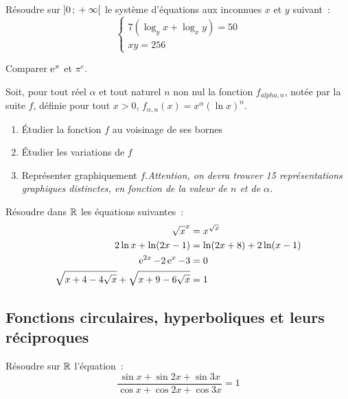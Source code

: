 \begin{exercice}
  Résoudre sur \(\left] 0 \, ; {} +\infty \right[\) le système d'équations aux 
  inconnues \(x\) et \(y\) suivant~:
  \begin{equation}
    \begin{cases} 7(\log_y x +\log_x y) = 50 \\ xy = 256 \end{cases} 
  \end{equation}
\end{exercice}

\begin{exercice}
  Comparer \(\operatorname{e}^\pi\) et \(\pi^e\).
\end{exercice}

\begin{exercice}
  Soit, pour tout réel \(\alpha\) et tout naturel \(n\) non nul la fonction 
  \(f_{alpha, n}\), notée par la suite \(f\), définie pour tout \(x>0\), 
  \(f_{\alpha, n}(x) = x^\alpha {(\ln x)}^n \).
  \begin{enumerate}
    \item Étudier la fonction \(f\) au voisinage de ses bornes
    \item Étudier les variations de \(f\)
    \item Représenter graphiquement \(f\).\emph{Attention, on devra trouver 15 
      représentations graphiques distinctes, en fonction de la valeur de \(n\) 
      et de \(\alpha\).}
  \end{enumerate}
\end{exercice}

\begin{exercice}
  Résoudre dans \(\mathbb{R}\) les équations suivantes~:
  \begin{align*}
    {\sqrt{x}}^x &= x^{\sqrt{x}} \\
    2\ln x + \ln(2x-1) &= \ln(2x+8) + 2\ln(x-1) \\
    \operatorname{e}^{2x} -2\operatorname{e}^x-3 & = 0 \\
    \sqrt{x+4-4\sqrt{x}} + \sqrt{x+9-6\sqrt{x}} &= 1
  \end{align*}
\end{exercice}

\subsection{Fonctions circulaires, hyperboliques et leurs réciproques}

\begin{exercice}
  Résoudre sur \(\mathbb{R}\) l'équation~:
  \begin{equation}
    \frac{\sin x + \sin 2x + \sin 3x}{\cos x + \cos 2x + \cos 3x} = 1
  \end{equation}
\end{exercice}

